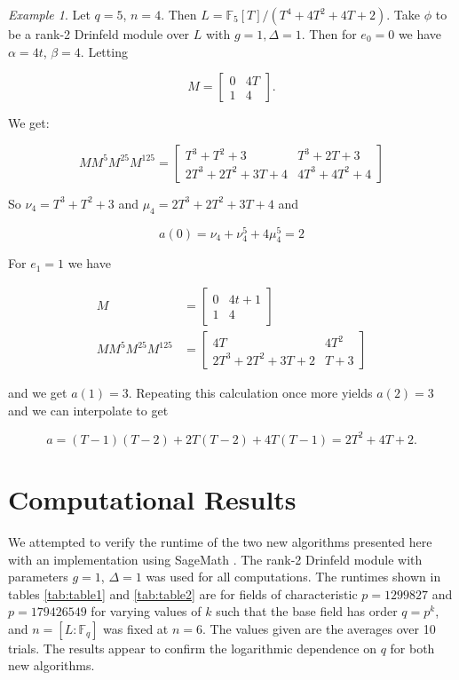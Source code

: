 \documentclass{jams-l}
\theoremstyle{remark}
\numberwithin{equation}{section}
\newtheorem{example}{Example}
\begin{document}
\begin{example}
Let $q = 5$, $n = 4$. Then $L = \mathbb{F}_5[T]/(T^4 + 4T^2 + 4T + 2)$. Take $\phi$ to be a rank-2 Drinfeld module over $L$ with $g = 1, \Delta = 1$. Then for $e_0 = 0$ we have $\alpha = 4t$, $\beta = 4$. Letting

\[M = \begin{bmatrix}0 & 4T \\ 1 & 4 \end{bmatrix}.\]

\noindent We get:

\[M M^{5} M^{25} M^{125} = \begin{bmatrix} T^3 + T^2 + 3 & T^3 + 2T + 3 \\ 2T^3 + 2T^2 + 3T + 4 & 4T^3 + 4T^2 + 4 \end{bmatrix}\]

\noindent So $\nu_4 = T^3 + T^2 + 3$ and $\mu_4 = 2T^3 + 2T^2 + 3T + 4$ and

\[a(0) = \nu_4 + \nu_4^5 + 4\mu_4^5 = 2\]

\noindent For $e_1 = 1$ we have 

\begin{align*}
M & = \begin{bmatrix}0 & 4t + 1 \\ 1 & 4 \end{bmatrix}\\
M M^{5} M^{25} M^{125} & = \begin{bmatrix} 4T & 4T^2 \\ 2T^3 + 2T^2 + 3T + 2 & T+3 \end{bmatrix}
\end{align*}

\noindent and we get $a(1) = 3$. Repeating this calculation once more yields $a(2) = 3$ and we can interpolate to get

\[a = (T-1)(T-2) + 2T(T-2) + 4T(T-1)   = 2T^2 + 4T + 2.\]

\end{example}

\section{Computational Results}

We attempted to verify the runtime of the two new algorithms presented here with an implementation using SageMath \cite{sagemath}. The rank-2 Drinfeld module with parameters $g = 1$, $\Delta = 1$ was used for all computations. The runtimes shown in tables \ref{tab:table1} and \ref{tab:table2} are for fields of characteristic $ p= 1299827$ and $ p = 179426549$ for varying values of $k$ such that the base field has order $q = p^k$, and $n = [L: \mathbb{F}_q]$ was fixed at $ n = 6$. The values given are the averages over 10 trials. The results appear to confirm the logarithmic dependence on $q$ for both new algorithms. 
\end{document}

